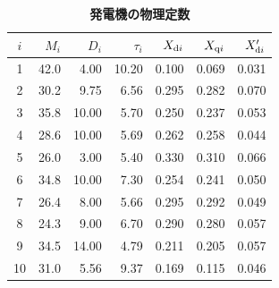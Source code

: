 \documentclass[tombow,dvipdfmx]{corona-a5-1.1}
\begin{document}
\begin{table}[h]
\medskip
\caption{\textbf{発電機の物理定数}} \label{table:ieee68genpara}
 \centering
 {
\begin{tabular}{crrrrrr}
   \hline
\multicolumn{1}{c}{$i$} & \multicolumn{1}{r}{$M_{i}$} & \multicolumn{1}{r}{$D_{i}$} & \multicolumn{1}{r}{$\tau_{i}$} & \multicolumn{1}{r}{$X_{{\rm d}i}$} & \multicolumn{1}{r}{$X_{{\rm q}i}$} & \multicolumn{1}{r}{$X_{{\rm d}i}'$}  \\
   \hline \hline
1  & \multicolumn{1}{r}{42.0}  & \multicolumn{1}{r}{4.00} & \multicolumn{1}{r}{10.20} & \multicolumn{1}{r}{0.100} & \multicolumn{1}{r}{0.069} & \multicolumn{1}{r}{0.031} \\
2  & \multicolumn{1}{r}{30.2}  & \multicolumn{1}{r}{9.75} & \multicolumn{1}{r}{6.56} & \multicolumn{1}{r}{0.295} & \multicolumn{1}{r}{0.282} & \multicolumn{1}{r}{0.070} \\
3  & \multicolumn{1}{r}{35.8}  & \multicolumn{1}{r}{10.00} & \multicolumn{1}{r}{5.70} & \multicolumn{1}{r}{0.250} & \multicolumn{1}{r}{0.237} & \multicolumn{1}{r}{0.053} \\
4  & \multicolumn{1}{r}{28.6}  & \multicolumn{1}{r}{10.00} & \multicolumn{1}{r}{5.69} & \multicolumn{1}{r}{0.262} & \multicolumn{1}{r}{0.258} & \multicolumn{1}{r}{0.044} \\
5  & \multicolumn{1}{r}{26.0}  & \multicolumn{1}{r}{3.00} & \multicolumn{1}{r}{5.40} & \multicolumn{1}{r}{0.330} & \multicolumn{1}{r}{0.310} & \multicolumn{1}{r}{0.066} \\
6  & \multicolumn{1}{r}{34.8}  & \multicolumn{1}{r}{10.00} & \multicolumn{1}{r}{7.30} & \multicolumn{1}{r}{0.254} & \multicolumn{1}{r}{0.241} & \multicolumn{1}{r}{0.050} \\
7  & \multicolumn{1}{r}{26.4}  & \multicolumn{1}{r}{8.00} & \multicolumn{1}{r}{5.66} & \multicolumn{1}{r}{0.295} & \multicolumn{1}{r}{0.292} & \multicolumn{1}{r}{0.049} \\
8  & \multicolumn{1}{r}{24.3}  & \multicolumn{1}{r}{9.00} & \multicolumn{1}{r}{6.70} & \multicolumn{1}{r}{0.290} & \multicolumn{1}{r}{0.280} & \multicolumn{1}{r}{0.057} \\
9  & \multicolumn{1}{r}{34.5}  & \multicolumn{1}{r}{14.00} & \multicolumn{1}{r}{4.79} & \multicolumn{1}{r}{0.211} & \multicolumn{1}{r}{0.205} & \multicolumn{1}{r}{0.057} \\
10 & \multicolumn{1}{r}{31.0}  & \multicolumn{1}{r}{5.56} & \multicolumn{1}{r}{9.37} & \multicolumn{1}{r}{0.169} & \multicolumn{1}{r}{0.115} & \multicolumn{1}{r}{0.046} \\

\end{tabular}}
\end{table}
\end{document}
